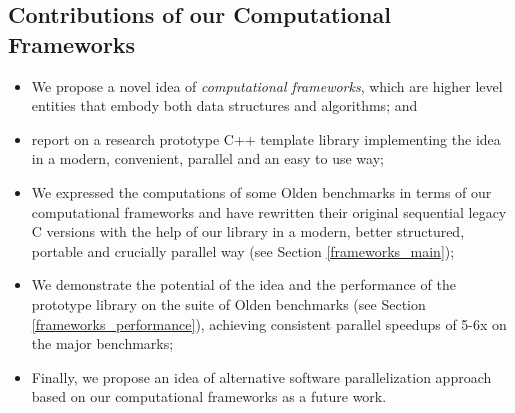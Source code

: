 \subsection{Contributions of our Computational Frameworks}
\begin{itemize}[style=unboxed,leftmargin=0cm]
\itemsep0em
\renewcommand\labelitemi{$\vartriangleright$}
\renewcommand\labelitemii{$\bullet$}
\item We propose a novel idea of \textit{computational frameworks}, which are higher level entities that embody both data structures and algorithms; and
\item report on a research prototype C++ template library \cite{frameworks-repo} implementing the idea in a modern, convenient, parallel and an easy to use way;
\item We expressed the computations of some Olden benchmarks in terms of our computational frameworks and have rewritten their original sequential legacy C versions with the help of our library in a modern, better structured, portable and crucially parallel way (see Section \ref{frameworks_main});
\item We demonstrate the potential of the idea and the performance of the prototype library on the suite of Olden benchmarks (see Section \ref{frameworks_performance}), achieving consistent parallel speedups of 5-6x on the major benchmarks;
\item Finally, we propose an idea of alternative software parallelization approach based on our computational frameworks as a future work.
\end{itemize}

%